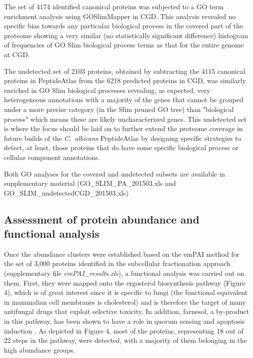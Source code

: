 The set of 4174 identified canonical proteins was subjected to a GO term enrichment
analysis using GOSlimMapper in CGD. This analysis revealed no specific bias towards any
particular biological process in the covered part of the proteome showing a very similar (no
statistically significant difference) histogram of frequencies of GO Slim biological process
terms as that for the entire genome at CGD.

The undetected set of 2103 proteins, obtained by subtracting the 4115 canonical proteins in
PeptideAtlas from the 6218 predicted proteins in CGD, was similarly enriched in GO Slim
biological processes revealing, as expected, very heterogeneous annotations with a majority
of the genes that cannot be grouped under a more precise category (in the Slim pruned GO
tree) than "biological process" which means these are likely uncharacterized genes. This
undetected set is where the focus should be laid on to further extend the proteome coverage
in future builds of the \textit{\mbox{C. albicans}} PeptideAtlas by designing specific strategies to detect, at
least, those proteins that do have some specific biological process or cellular component
annotations.

Both GO analyses for the covered and undetected subsets are available in supplementary
material (GO\_SLIM\_PA\_201503.xls and GO\_SLIM\_undetectedCGD\_201503.xls)



\subsection*{Assessment of protein abundance and functional analysis}

Once the abundance clusters were established based on the emPAI method for the set of
3,000 proteins identified in the subcellular fractionation approach (supplementary file
\textit{emPAI\_results.xls}), a functional analysis was carried out on them. First, they were mapped
onto the ergosterol biosynthesis pathway (Figure 4), which is of great interest since it is
specific to fungi (the functional equivalent in mammalian cell membranes is cholesterol) and
is therefore the target of many antifungal drugs that exploit selective toxicity. In addition,
farnesol, a by-product in this pathway, has been shown to have a role in quorum sensing \citep{Albuquerque2012}
and apoptosis induction \citep{Leger2015}. As depicted in Figure 4, most of the proteins, representing 18
out of 22 steps in the pathway, were detected, with a majority of them belonging in the high
abundance groups.






